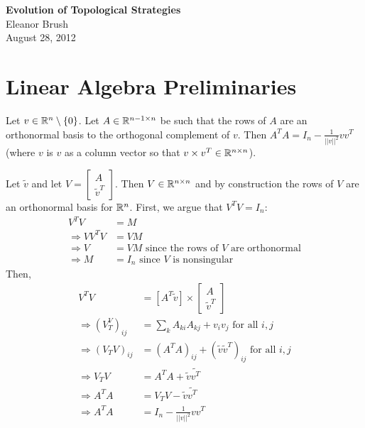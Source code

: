 \documentclass{article}
\begin{document}
\begin{center}
\Large

\end{center}


\vspace{0pt}

\begin{center}
{\bf \LARGE{Evolution of Topological Strategies}}
\vspace{10pt}
\\ Eleanor Brush
\\ August 28, 2012
\end{center}

\vspace{0pt}
\normalsize

\section{Linear Algebra Preliminaries}

\begin{claim}
Let $v\in{\mathbb{R}}^n\setminus\{0\}$.  Let $A\in{\mathbb{R}}^{n-1\times n}$ be such that the rows of $A$ are an orthonormal basis to the orthogonal complement of $v$.  Then $A^TA=I_n-\frac{1}{||v||^2}vv^T$ (where $v$ is $v$ as a column vector so that $v\times v^T\in{\mathbb{R}}^{n\times n}$).
\end{claim}

\begin{pf}
Let $\tilde{v}$ and let $V=\left[\begin{array}{cc}A \\ \tilde{v}^T\end{array}\right].$  Then $V\in{\mathbb{R}}^{n\times n}$ and by construction the rows of $V$ are an orthonormal basis for ${\mathbb{R}}^n$.  First, we argue that $V^TV=I_n:$
\begin{align*}
V^TV&=M
\\ \Rightarrow VV^TV&=VM
\\ \Rightarrow V&=VM \text{ since the rows of $V$ are orthonormal} 
\\ \Rightarrow M&=I_n \text{ since $V$ is nonsingular}
\end{align*}
Then,
\begin{align*}
V^TV&=\left[A^T \tilde{v}\right]\times\left[ \begin{array}{cc}A\\ \tilde{v}^T\end{array}\right]
\\\Rightarrow (V_T^V)_{ij}&=\sum_kA_{ki}A_{kj}+v_iv_j \text{ for all $i,j$}
\\ \Rightarrow (V_TV)_{ij}&=(A^TA)_{ij}+(\tilde{v}\tilde{v}^T)_{ij} \text{ for all $i,j$}
\\ \Rightarrow V_TV&=A^TA+\tilde{v}\tilde{v^T}
\\ \Rightarrow A^TA&=V_TV-\tilde{v}\tilde{v^T}
\\ \Rightarrow A^TA&=I_n-\frac{1}{||v||^2}vv^T
\end{align*}
\end{pf}
\end{document}
